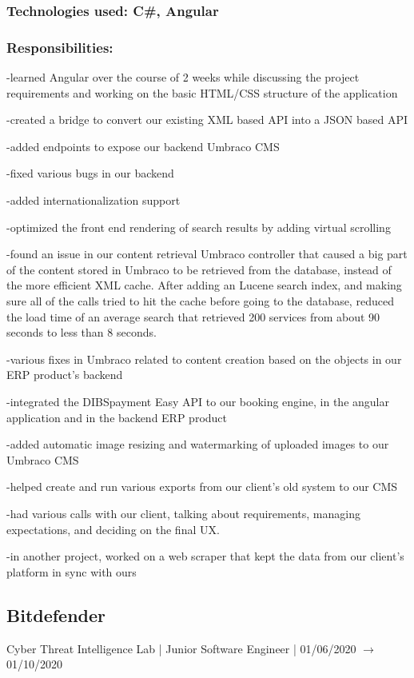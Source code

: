 \documentclass[a4paper,hidelinks,8pt]{article}
\begin{document}
\subsubsection{Technologies used: C\#, Angular}
\subsubsection{Responsibilities:}
-learned Angular over the course of 2 weeks while discussing the project requirements and working on the basic HTML/CSS structure of the application

-created a bridge to convert our existing XML based API into a JSON based API

-added endpoints to expose our backend Umbraco CMS

-fixed various bugs in our backend

-added internationalization support

-optimized the front end rendering of search results by adding virtual scrolling

-found an issue in our content retrieval Umbraco controller that caused a big part of the content stored in Umbraco to be retrieved from the database, instead of the more efficient XML cache. After adding an Lucene search index, and making sure all of the calls tried to hit the cache before going to the database, reduced the load time of an average search that retrieved 200 services from about 90 seconds to less than 8 seconds.

-various fixes in Umbraco related to content creation based on the objects in our ERP product's backend

-integrated the DIBSpayment Easy API to our booking engine, in the angular application and in the backend ERP product

-added automatic image resizing and watermarking of uploaded images to our Umbraco CMS

-helped create and run various exports from our client's old system to our CMS

-had various calls with our client, talking about requirements, managing expectations, and deciding on the final UX.

-in another project, worked on a web scraper that kept the data from our client's platform in sync with ours


\subsection{Bitdefender}Cyber Threat Intelligence Lab | Junior Software Engineer | 01/06/2020 $\rightarrow$ 01/10/2020
\end{document}
